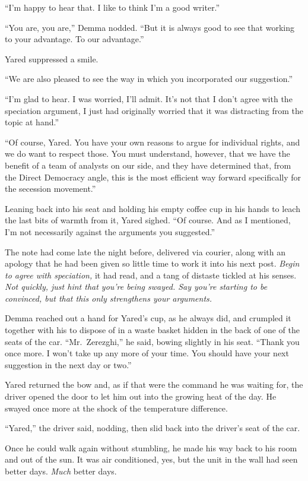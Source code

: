 ``I'm happy to hear that. I like to think I'm a good writer.''

``You are, you are,'' Demma nodded. ``But it is always good to see that working to your advantage. To our advantage.''

Yared suppressed a smile.

``We are also pleased to see the way in which you incorporated our suggestion.''

``I'm glad to hear. I was worried, I'll admit. It's not that I don't agree with the speciation argument, I just had originally worried that it was distracting from the topic at hand.''

``Of course, Yared. You have your own reasons to argue for individual rights, and we do want to respect those. You must understand, however, that we have the benefit of a team of analysts on our side, and they have determined that, from the Direct Democracy angle, this is the most efficient way forward specifically for the secession movement.''

Leaning back into his seat and holding his empty coffee cup in his hands to leach the last bits of warmth from it, Yared sighed. ``Of course. And as I mentioned, I'm not necessarily against the arguments you suggested.''

The note had come late the night before, delivered via courier, along with an apology that he had been given so little time to work it into his next post. \emph{Begin to agree with speciation,} it had read, and a tang of distaste tickled at his senses. \emph{Not quickly, just hint that you're being swayed. Say you're starting to be convinced, but that this only strengthens your arguments.}

Demma reached out a hand for Yared's cup, as he always did, and crumpled it together with his to dispose of in a waste basket hidden in the back of one of the seats of the car. ``Mr.~Zerezghi,'' he said, bowing slightly in his seat. ``Thank you once more. I won't take up any more of your time. You should have your next suggestion in the next day or two.''

Yared returned the bow and, as if that were the command he was waiting for, the driver opened the door to let him out into the growing heat of the day. He swayed once more at the shock of the temperature difference.

``Yared,'' the driver said, nodding, then slid back into the driver's seat of the car.

Once he could walk again without stumbling, he made his way back to his room and out of the sun. It was air conditioned, yes, but the unit in the wall had seen better days. \emph{Much} better days.

